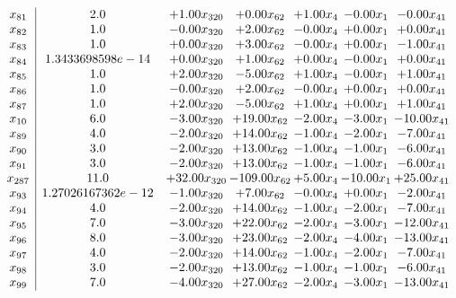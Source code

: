 \documentclass[8pt]{article}
\begin{document}
\[\begin{array}{c| c c@{\hskip 2pt} c@{\hskip 2pt} c@{\hskip 2pt} c@{\hskip 2pt} c@{\hskip 2pt} }
 x_{81}   &  2.0 & +  1.00 x_{320} & +  0.00 x_{62} & +  1.00 x_{4} & -0.00 x_{1} & -0.00 x_{41}\\
 x_{82}   &  1.0 & -0.00 x_{320} & +  2.00 x_{62} & -0.00 x_{4} & +  0.00 x_{1} & +  0.00 x_{41}\\
 x_{83}   &  1.0 & +  0.00 x_{320} & +  3.00 x_{62} & -0.00 x_{4} & +  0.00 x_{1} & -1.00 x_{41}\\
 x_{84}   &  1.3433698598e-14 & +  0.00 x_{320} & +  1.00 x_{62} & +  0.00 x_{4} & -0.00 x_{1} & +  0.00 x_{41}\\
 x_{85}   &  1.0 & +  2.00 x_{320} & -5.00 x_{62} & +  1.00 x_{4} & -0.00 x_{1} & +  1.00 x_{41}\\
 x_{86}   &  1.0 & -0.00 x_{320} & +  2.00 x_{62} & -0.00 x_{4} & +  0.00 x_{1} & +  0.00 x_{41}\\
 x_{87}   &  1.0 & +  2.00 x_{320} & -5.00 x_{62} & +  1.00 x_{4} & +  0.00 x_{1} & +  1.00 x_{41}\\
 x_{10}   &  6.0 & -3.00 x_{320} & + 19.00 x_{62} & -2.00 x_{4} & -3.00 x_{1} & -10.00 x_{41}\\
 x_{89}   &  4.0 & -2.00 x_{320} & + 14.00 x_{62} & -1.00 x_{4} & -2.00 x_{1} & -7.00 x_{41}\\
 x_{90}   &  3.0 & -2.00 x_{320} & + 13.00 x_{62} & -1.00 x_{4} & -1.00 x_{1} & -6.00 x_{41}\\
 x_{91}   &  3.0 & -2.00 x_{320} & + 13.00 x_{62} & -1.00 x_{4} & -1.00 x_{1} & -6.00 x_{41}\\
 x_{287}   &  11.0 & + 32.00 x_{320} & -109.00 x_{62} & +  5.00 x_{4} & -10.00 x_{1} & + 25.00 x_{41}\\
 x_{93}   &  1.27026167362e-12 & -1.00 x_{320} & +  7.00 x_{62} & -0.00 x_{4} & +  0.00 x_{1} & -2.00 x_{41}\\
 x_{94}   &  4.0 & -2.00 x_{320} & + 14.00 x_{62} & -1.00 x_{4} & -2.00 x_{1} & -7.00 x_{41}\\
 x_{95}   &  7.0 & -3.00 x_{320} & + 22.00 x_{62} & -2.00 x_{4} & -3.00 x_{1} & -12.00 x_{41}\\
 x_{96}   &  8.0 & -3.00 x_{320} & + 23.00 x_{62} & -2.00 x_{4} & -4.00 x_{1} & -13.00 x_{41}\\
 x_{97}   &  4.0 & -2.00 x_{320} & + 14.00 x_{62} & -1.00 x_{4} & -2.00 x_{1} & -7.00 x_{41}\\
 x_{98}   &  3.0 & -2.00 x_{320} & + 13.00 x_{62} & -1.00 x_{4} & -1.00 x_{1} & -6.00 x_{41}\\
 x_{99}   &  7.0 & -4.00 x_{320} & + 27.00 x_{62} & -2.00 x_{4} & -3.00 x_{1} & -13.00 x_{41}\\

\end{array}\]
\end{document}
